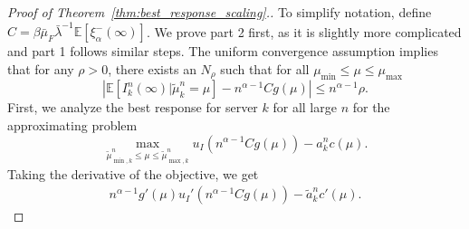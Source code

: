 \documentclass[a4paper,11pt,twoside]{article}
\numberwithin{equation}{section}
\numberwithin{figure}{section}
\theoremstyle{plain}
\newcommand{\EE}{\mathbb{E}}
\newcommand{\1}{\mathbbm{1}}
\begin{document}
\begin{proof}[Proof of Theorem~\ref{thm:best_response_scaling}.]
To simplify notation, define $C=\beta\bar{\mu}_F\bar{\lambda}^{-1}\EE[\xi_\alpha^{-}(\infty)]$. We prove part 2 first, as it is slightly more complicated and part 1 follows similar steps. 
The uniform convergence assumption implies that for any $\rho>0$, there exists an $N_\rho$ such that for all $\mu_{\min}\leq \mu\leq \mu_{\max}$
\begin{equation}\label{eq:approximation_idleness_uniform}
\left|\EE[I_k^n(\infty)|\tilde{\mu}_k^n=\mu]-n^{\alpha-1}Cg(\mu)\right|\leq n^{\alpha-1}\rho.
\end{equation}
First, we analyze the best response for server $k$ for all large $n$ for the approximating problem
\begin{equation}\label{eq:approximating_best_response}
 \max_{\tilde{\mu}_{\min,k}^n\leq \mu\leq \tilde{\mu}_{\max,k}^n}u_I(n^{\alpha-1}Cg(\mu))-a_k^nc(\mu).
\end{equation}
Taking the derivative of the objective, we get
\begin{align}\label{eq:asymptotic_utility_derivative}
n^{\alpha-1}g'(\mu)u_I'(n^{\alpha-1}Cg(\mu))-\tilde{a}_k^nc'(\mu).
\end{align}


\end{proof}
\end{document}
